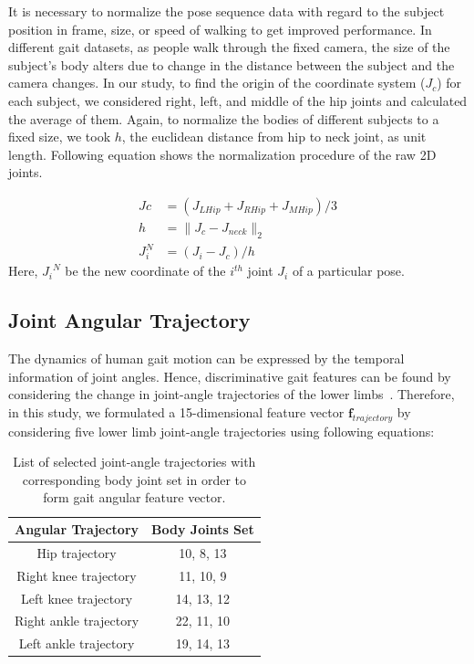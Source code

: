 It is necessary to normalize the pose sequence data with regard to the subject position in frame, size, or speed of walking to get improved performance. In different gait datasets, as people walk through the fixed camera, the size of the subject's body alters due to change in the distance between the subject and the camera changes. In our study, to find the origin of the coordinate system ($J_c$) for each subject, we considered right, left, and middle of the hip joints and calculated the average of them. Again, to normalize the bodies of different subjects to a fixed size, we took $ h $, the euclidean distance from hip to neck joint, as unit length. Following equation shows the normalization procedure of the raw 2D joints.

\begin{equation} \label{equ:normalization_raw_joint}
\begin{split}
	Jc &= {(J_{LHip} +J_{RHip} +J_{MHip})} / {3} \\
	h &= \parallel {J_c} - {J_{neck}}\parallel_2  \\
	J_{i}^{N}  &= (J_i - J_c) / h 
\end{split}
\end{equation}
Here, ${J_i}^N$ be the new coordinate of the $i^{th}$ joint $J_{i}$ of a particular pose.


\subsection{Joint Angular Trajectory}
The dynamics of human gait motion can be expressed by the temporal information of joint angles. Hence, discriminative gait features can be found by considering the change in joint-angle trajectories of the lower limbs~\cite{Wang_04}. Therefore, in this study, we formulated a 15-dimensional feature vector $\boldsymbol{f}_{trajectory}$ by considering five lower limb joint-angle trajectories using following equations: 

\begin{table}
	\centering
	\caption{List of selected joint-angle trajectories with corresponding body joint set in order to form gait angular feature vector. \label{table:list_joint_angle_trajectory}}
	\begin{tabular}{cc}
		\hline
		\textbf{Angular Trajectory} & \textbf{Body Joints Set}\\
		
		\hline
		Hip trajectory &10, 8, 13 \\
		Right knee trajectory  &11, 10, 9 \\
		Left knee trajectory &14, 13, 12 \\
		Right ankle trajectory &22, 11, 10 \\
		Left ankle trajectory &19, 14, 13 \\
		\hline
	\end{tabular}
\end{table}

